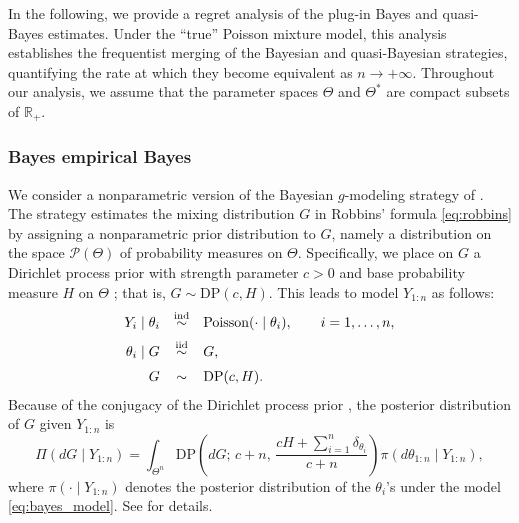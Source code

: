 \documentclass[twoside,12pt]{article}
\def\simind{\stackrel{\mbox{\scriptsize{ind}}}{\sim}}
\def\simiid{\stackrel{\mbox{\scriptsize{iid}}}{\sim}}
\begin{document}
In the following, we provide a regret analysis of the plug-in Bayes and quasi-Bayes estimates. Under the ``true'' Poisson mixture model, this analysis establishes the frequentist merging of the Bayesian and quasi-Bayesian strategies, quantifying the rate at which they become equivalent as $n\to+\infty$. Throughout our analysis, we assume that the parameter spaces $\Theta$ and $\Theta^{\ast}$ are compact subsets of $\mathbb{R}_{+}$.

\subsubsection{Bayes empirical Bayes}
We consider a nonparametric version of the Bayesian $g$-modeling strategy of \citet{Dee(81)}. The strategy estimates the mixing distribution $G$ in Robbins' formula \eqref{eq:robbins} by assigning a nonparametric prior distribution to $G$, namely a distribution on the space $\mathcal P(\Theta)$ of probability measures on $\Theta$. Specifically, we place on $G$ a Dirichlet process prior with strength parameter $c>0$ and base probability measure $H$ on $\Theta$ \citep{Fer(73)}; that is, $G\sim \mathrm{DP}(c,H)$. This leads to model $Y_{1:n}$ as follows:
\begin{equation}\label{eq:bayes_model}
\begin{array}{r@{\;}c@{\;}l@{\quad}c@{\quad}l}
Y_i& \mid &\theta_i& \simind &\mathrm{Poisson}(\cdot\mid \theta_i),\qquad i=1,\ldots,n,\\[0.2cm]
\theta_i& \mid &G& \simiid &G,\\[0.2cm]
&&G& \sim &\mathrm{DP}(c,H).
\end{array}
\end{equation}
Because of the conjugacy of the Dirichlet process prior \citep{Fer(73)}, the posterior distribution of $G$ given $Y_{1:n}$ is 
\begin{equation}\label{post_dp}
\Pi(dG\mid Y_{1:n})=\int_{\Theta^n}\mathrm{DP}\left(dG;\,c+n,\,\frac{cH+\sum_{i=1}^n\delta_{\theta_i}}{c+n}\right)\pi(d\theta_{1:n}\mid Y_{1:n}),
\end{equation}
where $\pi(\cdot\mid Y_{1:n})$ denotes the posterior distribution of the $\theta_{i}$'s under the model \eqref{eq:bayes_model}. See \citet{Lo(84)} for details.
\end{document}
